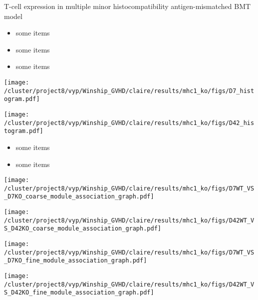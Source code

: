 \documentclass[final,hyperref={pdfpagelabels=false}]{beamer}
\begin{document}
\begin{frame}{}
\begin{columns}[t]
\begin{column}{.24\linewidth}
\begin{block}{T-cell expression in multiple minor histocompatibility antigen-mismatched BMT model}
          \begin{itemize}
          \item some items
          \item some items
          \item some items
          \end{itemize}
	  \begin{minipage}{0.45\textwidth}
            \texttt{[image: /cluster/project8/vyp/Winship\_GVHD/claire/results/mhc1\_ko/figs/D7\_histogram.pdf]}
          \end{minipage}
	  \begin{minipage}{0.45\textwidth}
            \texttt{[image: /cluster/project8/vyp/Winship\_GVHD/claire/results/mhc1\_ko/figs/D42\_histogram.pdf]}
          \end{minipage}
	  \begin{itemize}
	    \item some items
	    \item some items
	    \end{itemize}  
	       \begin{minipage}{0.45\textwidth}
            \texttt{[image: /cluster/project8/vyp/Winship\_GVHD/claire/results/mhc1\_ko/figs/D7WT\_VS\_D7KO\_coarse\_module\_association\_graph.pdf]}
          \end{minipage}
          \begin{minipage}{0.45\textwidth}
            \texttt{[image: /cluster/project8/vyp/Winship\_GVHD/claire/results/mhc1\_ko/figs/D42WT\_VS\_D42KO\_coarse\_module\_association\_graph.pdf]}
          \end{minipage}
	  \begin{minipage}{0.45\textwidth}
            \texttt{[image: /cluster/project8/vyp/Winship\_GVHD/claire/results/mhc1\_ko/figs/D7WT\_VS\_D7KO\_fine\_module\_association\_graph.pdf]}
          \end{minipage}
          \begin{minipage}{0.45\textwidth}
            \texttt{[image: /cluster/project8/vyp/Winship\_GVHD/claire/results/mhc1\_ko/figs/D42WT\_VS\_D42KO\_fine\_module\_association\_graph.pdf]}
          \end{minipage}
        \end{block}
      \end{column}




\end{columns}
\end{frame}
\end{document}
